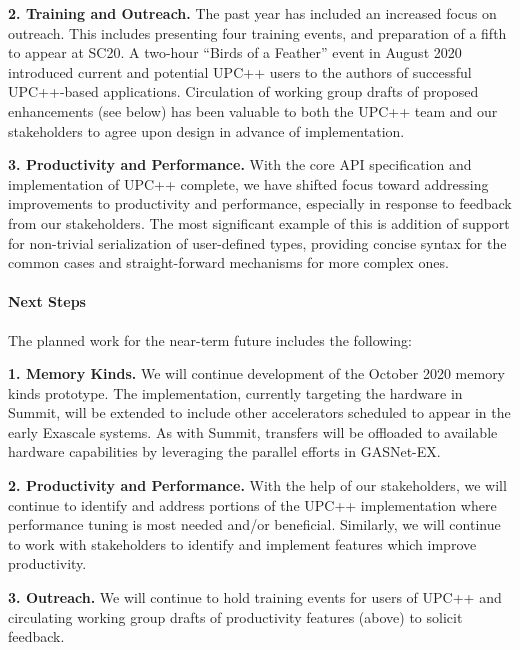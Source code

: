 \textbf{2. Training and Outreach.}
The past year has included an increased focus on outreach.  This includes
presenting four training events, and preparation of a fifth to appear at SC20.
A two-hour ``Birds of a Feather'' event in August 2020 introduced current and
potential UPC++ users to the authors of successful UPC++-based applications.
Circulation of working group drafts of proposed enhancements (see below) has
been valuable to both the UPC++ team and our stakeholders to agree upon design
in advance of implementation.

\textbf{3. Productivity and Performance.}
With the core API specification and implementation of UPC++ complete, we have
shifted focus toward addressing improvements to productivity and performance,
especially in response to feedback from our stakeholders.  The most significant
example of this is addition of support for non-trivial serialization of
user-defined types, providing concise syntax for the common cases and
straight-forward mechanisms for more complex ones.

\paragraph{Next Steps}

The planned work for the near-term future includes the following:

\textbf{1. Memory Kinds.}
We will continue development of the October 2020 memory kinds prototype.  The
implementation, currently targeting the hardware in Summit, will be extended to
include other accelerators scheduled to appear in the early Exascale systems.
As with Summit, transfers will be offloaded to available hardware capabilities
by leveraging the parallel efforts in GASNet-EX.

\textbf{2. Productivity and Performance.}
With the help of our stakeholders, we will continue to identify and address
portions of the UPC++ implementation where performance tuning is most needed
and/or beneficial.  Similarly, we will continue to work with stakeholders to
identify and implement features which improve productivity.

\textbf{3. Outreach.}
We will continue to hold training events for users of UPC++ and circulating
working group drafts of productivity features (above) to solicit feedback.
